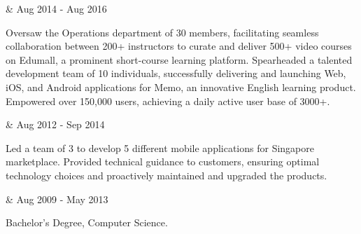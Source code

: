 \begin{workexp}
   \at \href{https://topica.asia/}{}  &
  Aug 2014 - Aug 2016 
\end{workexp}

\tbullet Oversaw the Operations department of 30 members, facilitating seamless collaboration between 200+ instructors to curate and deliver 500+ video courses on Edumall, a prominent short-course learning platform. \newline
\tbullet Spearheaded a talented development team of 10 individuals, successfully delivering and launching Web, iOS, and Android applications for Memo, an innovative English learning product. Empowered over 150,000 users, achieving a daily active user base of 3000+. \newline

\begin{workexp}
   \at \href{https://vinova.sg/}{}  &
  Aug 2012 - Sep 2014 
\end{workexp}

\tbullet Led a team of 3 to develop 5 different mobile applications for Singapore marketplace. \newline
\tbullet Provided technical guidance to customers, ensuring optimal technology choices and proactively maintained and upgraded the products. \newline

\begin{workexp}
   \at \href{https://e.uet.vnu.edu.vn}{} &
  Aug 2009 - May 2013 
\end{workexp}

\tbullet Bachelor's Degree, Computer Science.
